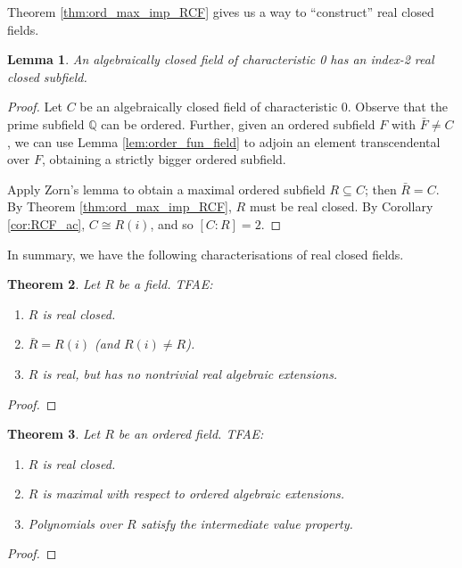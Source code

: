 \documentclass[a4paper]{report}
\newtheorem{theorem}{Theorem}
\newtheorem{lemma}[theorem]{Lemma}
\theoremstyle{definition}
\newcommand\Q{\mathbb{Q}}
\begin{document}
Theorem \ref{thm:ord_max_imp_RCF} gives us a way to ``construct'' real closed fields.

\begin{lemma}
  \label{lem:ACF_ind_2_RCF}
  An algebraically closed field of characteristic 0 has an index-2 real closed subfield.
\end{lemma}
\begin{proof}
  Let $C$ be an algebraically closed field of characteristic 0. Observe that the prime subfield $\Q$ can be ordered. Further, given an ordered subfield $F$ with $\bar{F}\neq C$, we can use Lemma \ref{lem:order_fun_field} to adjoin an element transcendental over $F$, obtaining a strictly bigger ordered subfield.
  
  Apply Zorn's lemma to obtain a maximal ordered subfield $R\subseteq C$; then $\bar{R}=C$. By Theorem \ref{thm:ord_max_imp_RCF}, $R$ must be real closed. By Corollary \ref{cor:RCF_ac}, $C\cong R(i)$, and so $[C:R]=2$.
\end{proof}

In summary, we have the following characterisations of real closed fields.

\begin{theorem}
  \label{thm:RCF_tfae}
  Let $R$ be a field. TFAE:
  \begin{enumerate}
    \item $R$ is real closed.
    \item $\bar{R}=R(i)$ (and $R(i)\neq R$).
    \item $R$ is real, but has no nontrivial real algebraic extensions.
  \end{enumerate}
\end{theorem}
\begin{proof}
\end{proof}

\begin{theorem}
  \label{thm:RCF_tfae_ord}
  Let $R$ be an ordered field. TFAE:
  \begin{enumerate}
    \item $R$ is real closed.
    \item $R$ is maximal with respect to ordered algebraic extensions.
    \item Polynomials over $R$ satisfy the intermediate value property.
  \end{enumerate}
\end{theorem}
\begin{proof}
\end{proof}
\end{document}
